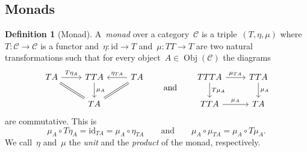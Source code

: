 \documentclass[a4paper]{article}
\theoremstyle{plain}
\theoremstyle{definition}
\newtheorem{definition}[theorem]{Definition}
\DeclareMathOperator{\Obj}{Obj}
\newcommand{\id}{\mathrm{id}}
\newcommand{\cat}[1]{\mathcal{#1}}
\begin{document}
\subsection{Monads}
\begin{definition}[Monad]
    \label{def:monad}
    A~\emph{monad} over a category~\(\cat{C}\) is a triple~\((T,\eta,\mu)\)
    where~\(T:\cat{C}\longrightarrow\cat{C}\) is a functor
    and~\(\eta:\id\longrightarrow T\) and~\(\mu:TT\longrightarrow T\) are two
    natural transformations such that for every object~\(A\in\Obj(\cat{C})\) the
    diagrams
    \[
        \begin{tikzcd}
            TA \arrow[r, "T\eta_{A}"] & TTA \arrow[d, "\mu_{A}"] & TA \arrow[l,
            swap, "\eta_{TA}"] \\
                                      & TA \arrow[ul, equal] \arrow[ur, equal] &
        \end{tikzcd}
        \qquad\text{and}\qquad
        \begin{tikzcd}
            TTTA \arrow[r, "\mu_{TA}"] \arrow[d, "T\mu_{A}"] & TTA \arrow[d,
            "\mu_{A}"] \\
            TTA \arrow[r, "\mu_{A}"] & TA
        \end{tikzcd}
    \]
    are commutative. This is
    \[
        \mu_{A}\circ T\eta_{A} = \id_{TA} = \mu_{A}\circ\eta_{TA}
        \qquad\text{and}\qquad
        \mu_{A}\circ \mu_{TA}
        = \mu_{A} \circ T\mu_{A}.
    \]
    We call~\(\eta\) and~\(\mu\) the \emph{unit} and the \emph{product} of the
    monad, respectively.
\end{definition}
\end{document}
